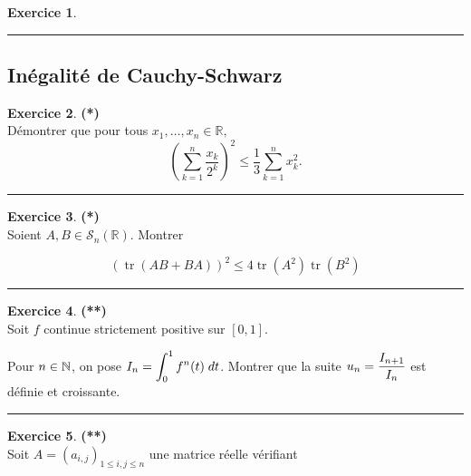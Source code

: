 \documentclass[a4paper,11pt]{article}
\theoremstyle{definition}
\newtheorem{exo}{Exercice} %
\begin{document}
\begin{minipage}{1\linewidth}
\begin{minipage}[t]{0.48\linewidth}
\begin{exo}
			\centering\rule{1\linewidth}{0.6pt}\end{exo}
		
		\subsection*{Inégalité de Cauchy-Schwarz}
		
		
		\begin{exo}\textbf{(*)}\quad\\[0.2cm]
			Démontrer que pour tous $x_1,\dots,x_n\in\mathbb R,$
			$$\left(\sum_{k=1}^n \frac{x_k}{2^k}\right)^2\leq\frac 13\sum_{k=1}^n x_k^2.$$
			
			\centering\rule{1\linewidth}{0.6pt}\end{exo}
		
		
		
		\begin{exo}\textbf{(*)}\quad\\[0.2cm]
			
			Soient $A, B \in \mathcal{S}_{n}(\mathbb{R})$. Montrer
			
			$$
			(\operatorname{tr}(A B+B A))^{2} \leq 4 \operatorname{tr}\left(A^{2}\right) \operatorname{tr}\left(B^{2}\right)
			$$
			
			\centering\rule{1\linewidth}{0.6pt}\end{exo}
		
		
		
		
	\end{minipage}\hfill\vrule\hfill\begin{minipage}[t]{0.48\linewidth}\raggedright
		
		\begin{exo}\textbf{(**)}\quad\\[0.2cm]
			Soit $f$ continue strictement positive sur $[0,1]$.
			
			Pour $n\in\mathbb{N}$, on pose $\displaystyle I_n=\int_{0}^{1}f^n(t)\;dt$.
			Montrer que la suite $\displaystyle u_n=\frac{I_{n+1}}{I_n}$ est définie et croissante.
			
			\centering\rule{1\linewidth}{0.6pt}\end{exo}
		
		
		\begin{exo}\textbf{(**)}\quad\\[0.2cm]
			
			Soit $A=\left(a_{i, j}\right)_{1 \leq i, j \leq n}$ une matrice réelle vérifiant
			

\end{exo}
\end{minipage}
\end{minipage}
\end{document}
